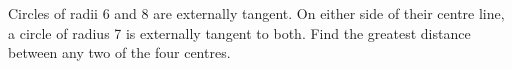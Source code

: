 Circles of radii 6 and 8 are externally tangent. On either side of their centre line, a circle of radius 7 is externally tangent to both. Find the greatest distance between any two of the four centres.
